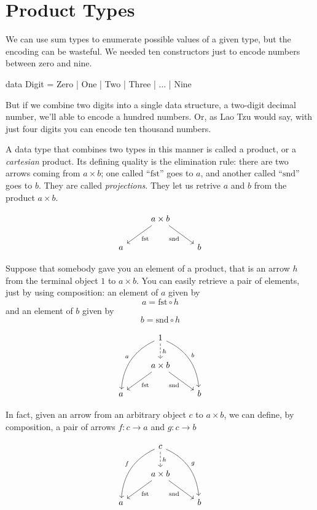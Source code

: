 \documentclass[DaoFP]{subfiles}
\begin{document}
\setcounter{chapter}{4}

\chapter{Product Types}

We can use sum types to enumerate possible values of a given type, but the encoding can be wasteful. We needed ten constructors just to encode numbers between zero and nine.
\begin{haskell}
data Digit = Zero | One | Two | Three | ... | Nine
\end{haskell}
But if we combine two digits into a single data structure, a two-digit decimal number, we'll able to encode a hundred numbers. Or, as Lao Tzu would say, with just four digits you can encode ten thousand numbers.

A data type that combines two types in this manner is called a product, or a \emph{cartesian} product. Its defining quality is the elimination rule: there are two arrows coming from $a \times b$; one called ``$\text{fst}$'' goes to $a$, and another called ``$\text{snd}$'' goes to $b$. They are called \emph{projections}. They let us retrive $a$ and $b$ from the product $a \times b$.

\[
 \begin{tikzcd}
& a \times b
 \arrow[dl,  "\text{fst}"]
 \arrow[dr,   "\text{snd}"']
\\
a && b
 \end{tikzcd}
\]

Suppose that somebody gave you an element of a product, that is an arrow $h$ from the terminal object $1$ to $a \times b$. You can easily retrieve a pair of elements, just by using composition: an element of $a$ given by 
\[a = \text{fst} \circ h \]
and an element of $b$ given by
\[b = \text{snd} \circ h \]

\[
 \begin{tikzcd}
 & 1
\arrow[d, dashed, "h"]
 \arrow[ddl, bend right, "a"']
 \arrow[ddr, bend left, "b"]
\\
&a \times b
 \arrow[dl,  "\text{fst}"]
 \arrow[dr,   "\text{snd}"']
\\
a && b
 \end{tikzcd}
\]

In fact, given an arrow from an arbitrary object $c$ to $a \times b$, we can define, by composition, a pair of arrows $f \colon c \to a$ and $g \colon c \to b$

\[
 \begin{tikzcd}
 & c
\arrow[d, dashed, "h"]
 \arrow[ddl, bend right, "f"']
 \arrow[ddr, bend left, "g"]
\\
&a \times b
 \arrow[dl,  "\text{fst}"]
  \arrow[dr,   "\text{snd}"']
\\
a && b
 \end{tikzcd}
\]
\end{document}
